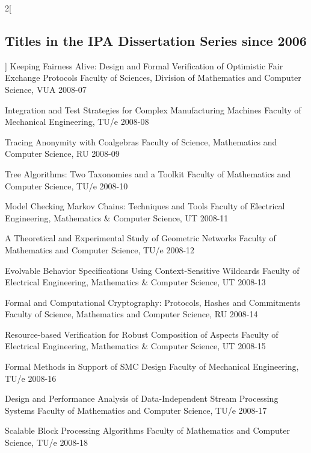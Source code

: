 \begin{multicols}{2}[\subsection*{Titles in the IPA Dissertation Series since 2006}]
         {Keeping Fairness Alive: Design and Formal Verification of Optimistic Fair Exchange Protocols}
         {Faculty of Sciences, Division of Mathematics and Computer Science, VUA}
         {2008-07}

         {Integration and Test Strategies for Complex Manufacturing Machines}
         {Faculty of Mechanical Engineering, TU/e}
         {2008-08}

         {Tracing Anonymity with Coalgebras}
         {Faculty of Science, Mathematics and Computer Science, RU}
         {2008-09}

         {Tree Algorithms: Two Taxonomies and a Toolkit}
         {Faculty of Mathematics and Computer Science, TU/e}
         {2008-10}

         {Model Checking Markov Chains: Techniques and Tools}
         {Faculty of Electrical Engineering, Mathematics \& Computer Science, UT}
         {2008-11}

         {A Theoretical and Experimental Study of Geometric Networks}
         {Faculty of Mathematics and Computer Science, TU/e}
         {2008-12}

         {Evolvable Behavior Specifications Using Context-Sensitive Wildcards}
         {Faculty of Electrical Engineering, Mathematics \& Computer Science, UT}
         {2008-13}

         {Formal and Computational Cryptography: Protocols, Hashes and Commitments}
         {Faculty of Science, Mathematics and Computer Science, RU}
         {2008-14}

         {Resource-based Verification for Robust Composition of Aspects}
         {Faculty of Electrical Engineering, Mathematics \& Computer Science, UT}
         {2008-15}

         {Formal Methods in Support of SMC Design}
         {Faculty of Mechanical Engineering, TU/e}
         {2008-16}

         {Design and Performance Analysis of Data-Independent Stream Processing       Systems}
         {Faculty of Mathematics and Computer Science, TU/e}
         {2008-17}

         {Scalable Block Processing Algorithms}
         {Faculty of Mathematics and Computer Science, TU/e}
         {2008-18}


\end{multicols}
